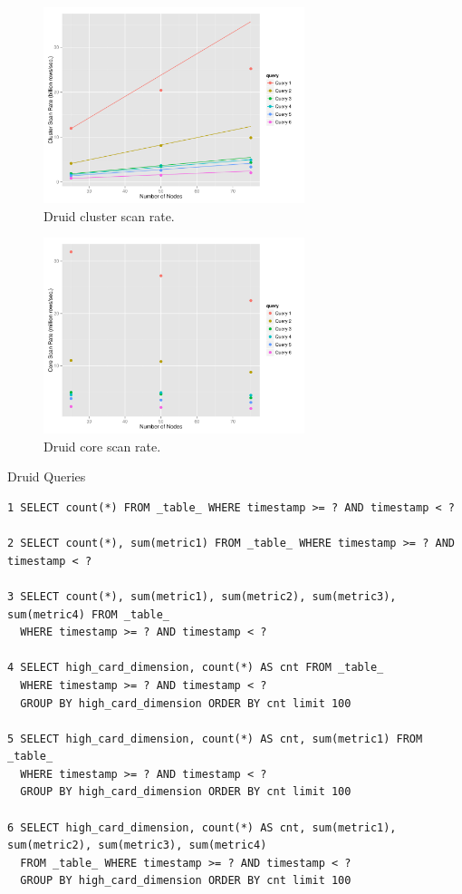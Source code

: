 \documentclass{vldb}
\begin{document}
\begin{figure}
\centering
\includegraphics[width = 3in]{cluster_scan_rate}
\caption{Druid cluster scan rate.}
\label{fig:cluster_scan_rate}
\end{figure}

\begin{figure}
\centering
\includegraphics[width = 3in]{core_scan_rate}
\caption{Druid core scan rate.}
\label{fig:core_scan_rate}
\end{figure}

\begin{table}
  \centering
  \caption{Druid Queries}
  \label{tab:sql_queries}
\begin{verbatim}
1 SELECT count(*) FROM _table_ WHERE timestamp >= ? AND timestamp < ?

2 SELECT count(*), sum(metric1) FROM _table_ WHERE timestamp >= ? AND timestamp < ?

3 SELECT count(*), sum(metric1), sum(metric2), sum(metric3), sum(metric4) FROM _table_
  WHERE timestamp >= ? AND timestamp < ?

4 SELECT high_card_dimension, count(*) AS cnt FROM _table_
  WHERE timestamp >= ? AND timestamp < ?
  GROUP BY high_card_dimension ORDER BY cnt limit 100

5 SELECT high_card_dimension, count(*) AS cnt, sum(metric1) FROM _table_
  WHERE timestamp >= ? AND timestamp < ?
  GROUP BY high_card_dimension ORDER BY cnt limit 100

6 SELECT high_card_dimension, count(*) AS cnt, sum(metric1), sum(metric2), sum(metric3), sum(metric4)
  FROM _table_ WHERE timestamp >= ? AND timestamp < ?
  GROUP BY high_card_dimension ORDER BY cnt limit 100
\end{verbatim}
\end{table}
\end{document}
